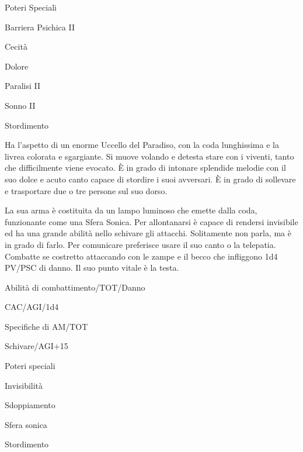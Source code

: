 \begin{parmostro}{Poteri Speciali}
\item Barriera Psichica II
\item Cecit\`a
\item Dolore
\item Paralisi II
\item Sonno II
\item Stordimento
\end{parmostro}


Ha l'aspetto di un enorme Uccello del Paradiso, con la coda
lunghissima e la livrea colorata e sgargiante. Si muove volando e
detesta stare con i viventi, tanto che difficilmente viene evocato. \`E
in grado di intonare splendide melodie con il suo dolce e acuto canto
capace di stordire i suoi avversari. \`E in grado di sollevare e
trasportare due o tre persone sul suo dorso.

La sua arma \`e costituita da un lampo luminoso che emette dalla
coda, funzionante come una Sfera Sonica. Per allontanarsi \`e capace
di rendersi invisibile ed ha una grande abilit\`a nello schivare gli
attacchi. Solitamente non parla, ma \`e in grado di farlo. Per
comunicare preferisce usare il suo canto o la telepatia. Combatte se
costretto attaccando con le zampe e il becco che infliggono 1d4 PV/PSC
di danno. Il suo punto vitale \`e la testa.


\begin{parmostro}{Abilit\`a di combattimento/TOT/Danno}
\item CAC/AGI/1d4
\end{parmostro}

\begin{parmostro}{Specifiche di AM/TOT}
\item  Schivare/AGI+15
\end{parmostro}

\begin{parmostro}{Poteri speciali}
\item Invisibilit\`a
\item Sdoppiamento
\item Sfera sonica
\item Stordimento
\end{parmostro}


